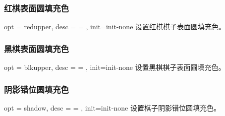 \documentclass[full]{l3doc}
\begin{document}
\begin{documentation}
\begin{SideBySideExample}[frame=single,numbers=left,
                xrightmargin=.60\linewidth,gobble=2]
  \centering
  \cchessboard[donut=red]
\end{SideBySideExample}

\bigskip

\subsubsection{红棋表面圆填充色}

\begin{option}{ opt = redupper, desc = {= }, init=init-none }
  设置红棋棋子表面圆填充色。
\end{option}

\begin{SideBySideExample}[frame=single,numbers=left,
                xrightmargin=.60\linewidth,gobble=2]
  \centering
  \cchessboard[redupper=red,
             redpiece=white]
\end{SideBySideExample}

\bigskip

\subsubsection{黑棋表面圆填充色}

\begin{option}{ opt = blkupper, desc = {= }, init=init-none }
  设置黑棋棋子表面圆填充色。
\end{option}

\begin{SideBySideExample}[frame=single,numbers=left,
                xrightmargin=.60\linewidth,gobble=2]
  \centering
  \cchessboard[blkupper=black,
               blkpiece=white]
\end{SideBySideExample}

\bigskip

\subsubsection{阴影错位圆填充色}

\begin{option}{ opt = shadow, desc = {= }, init=init-none }
  设置棋子阴影错位圆填充色。
\end{option}


\end{documentation}
\end{document}

